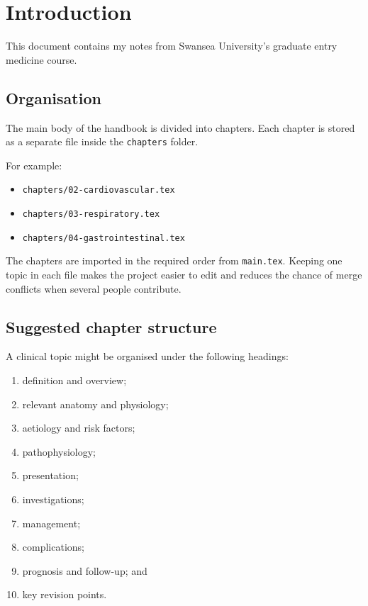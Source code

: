 \chapter{Introduction}

This document contains my notes from Swansea University's graduate entry medicine course.

\section{Organisation}

The main body of the handbook is divided into chapters. Each chapter is
stored as a separate file inside the \texttt{chapters} folder.

For example:

\begin{itemize}
    \item \texttt{chapters/02-cardiovascular.tex}
    \item \texttt{chapters/03-respiratory.tex}
    \item \texttt{chapters/04-gastrointestinal.tex}
\end{itemize}

The chapters are imported in the required order from
\texttt{main.tex}. Keeping one topic in each file makes the project
easier to edit and reduces the chance of merge conflicts when several
people contribute.

\section{Suggested chapter structure}

A clinical topic might be organised under the following headings:

\begin{enumerate}
    \item definition and overview;
    \item relevant anatomy and physiology;
    \item aetiology and risk factors;
    \item pathophysiology;
    \item presentation;
    \item investigations;
    \item management;
    \item complications;
    \item prognosis and follow-up; and
    \item key revision points.
\end{enumerate}


